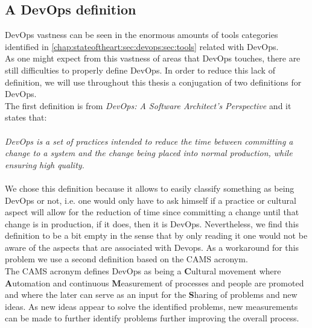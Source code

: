         \subsection{A DevOps definition} \label{chap:stateoftheart:sec:devops:sec:definition}
        DevOps vastness can be seen in the enormous amounts of tools categories identified in \ref{chap:stateoftheart:sec:devops:sec:tools} related with DevOps.\\
        As one might expect from this vastness of areas that DevOps touches, there are still difficulties to properly define DevOps. In order to reduce this lack of definition, we will use throughout this thesis a conjugation of two definitions for DevOps.\\
        The first definition is from \textit{DevOps: A Software Architect's Perspective} \cite{Bass} and it states that: \\
        \\
        \textit{DevOps is a set of practices intended to reduce the time between committing a change to a system and the change being placed into normal production, while ensuring high quality.} \\
        \\
        We chose this definition because it allows to easily classify something as being DevOps or not, i.e. one would only have to ask himself if a practice or cultural aspect will allow for the reduction of time since committing a change until that change is in production, if it does, then it is DevOps. Nevertheless, we find this definition to be a bit empty in the sense that by only reading it one would not be aware of the aspects that are associated with Devops. As a workaround for this problem we use a second definition based on the CAMS acronym.\\
        The CAMS acronym \cite{Willis2010} defines DevOps as being a \textbf{C}ultural movement where \textbf{A}utomation and continuous \textbf{M}easurement of processes and people are promoted and where the later can serve as an input for the \textbf{S}haring of problems and new ideas. As new ideas appear to solve the identified problems, new measurements can be made to further identify problems further improving the overall process.

